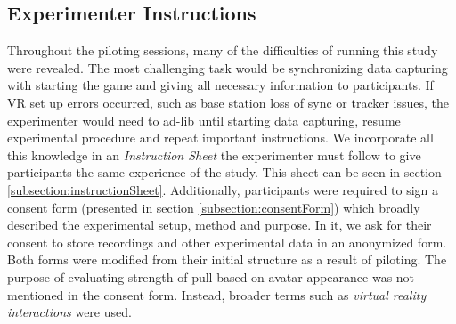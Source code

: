 \subsection{Experimenter Instructions}
Throughout the piloting sessions, many of the difficulties of running this study were revealed. The most challenging task would be synchronizing data capturing with starting the game and giving all necessary information to participants. If VR set up errors occurred, such as base station loss of sync or tracker issues, the experimenter would need to ad-lib until starting data capturing, resume experimental procedure and repeat important instructions. We incorporate all this knowledge in an \textit{Instruction Sheet} the experimenter must follow to give participants the same experience of the study. This sheet can be seen in section \ref{subsection:instructionSheet}. Additionally, participants were required to sign a consent form (presented in section \ref{subsection:consentForm}) which broadly described the experimental setup, method and purpose. In it, we ask for their consent to store recordings and other experimental data in an anonymized form. Both forms were modified from their initial structure as a result of piloting. The purpose of evaluating strength of pull based on avatar appearance was not mentioned in the consent form. Instead, broader terms such as \textit{virtual reality interactions} were used.

